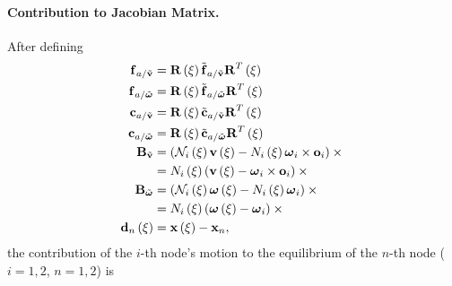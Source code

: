 \paragraph{Contribution to Jacobian Matrix.}
After defining
\begin{subequations}
\begin{align}
	\T{f}_{a/\tilde{\T{v}}} &= \TT{R}\plbr{\xi} \tilde{\T{f}}_{a/\tilde{\T{v}}} \TT{R}^T\plbr{\xi} \\
	\T{f}_{a/\tilde{\T{\omega}}} &= \TT{R}\plbr{\xi} \tilde{\T{f}}_{a/\tilde{\T{\omega}}} \TT{R}^T\plbr{\xi} \\
	\T{c}_{a/\tilde{\T{v}}} &= \TT{R}\plbr{\xi} \tilde{\T{c}}_{a/\tilde{\T{v}}} \TT{R}^T\plbr{\xi} \\
	\T{c}_{a/\tilde{\T{\omega}}} &= \TT{R}\plbr{\xi} \tilde{\T{c}}_{a/\tilde{\T{\omega}}} \TT{R}^T\plbr{\xi} \\
	\TT{B}_{\tilde{\T{v}}} &= \plbr{
		\mathcal{N}_i\plbr{\xi} \T{v}\plbr{\xi}
		- N_i\plbr{\xi} \T{\omega}_i \times \T{o}_i
	} \times{}
	\nonumber \\
	&= N_i\plbr{\xi} \plbr{
		\T{v}\plbr{\xi}
		- \T{\omega}_i \times \T{o}_i
	} \times{}
	\\
	\TT{B}_{\tilde{\T{\omega}}} &= \plbr{
		\mathcal{N}_i\plbr{\xi} \T{\omega}\plbr{\xi}
		- N_i\plbr{\xi} \T{\omega}_i
	} \times{}
	\nonumber \\
	&= N_i\plbr{\xi} \plbr{
		\T{\omega}\plbr{\xi}
		- \T{\omega}_i
	} \times{}
	\\
	\T{d}_n\plbr{\xi} &= \T{x}\plbr{\xi} - \T{x}_n
	,
\end{align}
\end{subequations}
the contribution of the $i$-th node's motion to the equilibrium
of the $n$-th node ($i=1,2$, $n=1,2$) is
